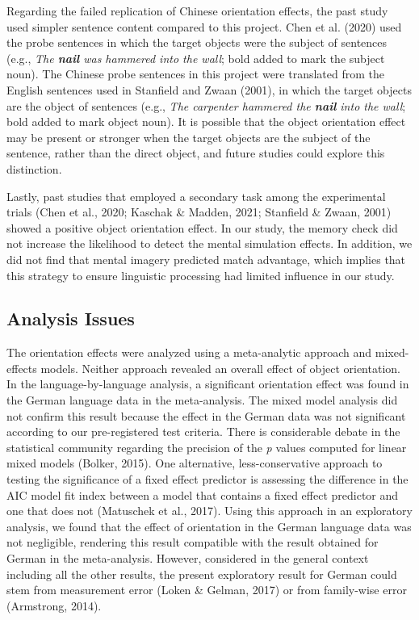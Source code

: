 \documentclass[
  man,floatsintext]{apa7}
\begin{document}
Regarding the failed replication of Chinese orientation effects, the
past study used simpler sentence content compared to this project.
Chen et al. (2020) used the probe sentences in which the target
objects were the subject of sentences (e.g., \emph{The \textbf{nail} was hammered
into the wall}; bold added to mark the subject noun). The Chinese probe
sentences in this project were translated from the English sentences
used in Stanfield and Zwaan (2001), in which the target objects are the
object of sentences (e.g., \emph{The carpenter hammered the \textbf{nail} into the
wall}; bold added to mark object noun). It is possible that the object
orientation effect may be present or stronger when the target objects
are the subject of the sentence, rather than the direct object, and
future studies could explore this distinction.

Lastly, past studies that employed a secondary task among the
experimental trials (Chen et al., 2020; Kaschak \& Madden, 2021; Stanfield \& Zwaan, 2001) showed a
positive object orientation effect. In our study, the memory check did
not increase the likelihood to detect the mental simulation effects. In
addition, we did not find that mental imagery predicted match advantage,
which implies that this strategy to ensure linguistic processing had
limited influence in our study.

\hypertarget{analysis-issues}{%
\subsection{Analysis Issues}\label{analysis-issues}}

The orientation effects were analyzed using a meta-analytic approach and
mixed-effects models. Neither approach revealed an overall effect of
object orientation. In the language-by-language analysis, a significant
orientation effect was found in the German language data in the
meta-analysis. The mixed model analysis did not confirm this result
because the effect in the German data was not significant according to
our pre-registered test criteria. There is considerable debate in the
statistical community regarding the precision of the \emph{p} values computed
for linear mixed models (Bolker, 2015). One alternative,
less-conservative approach to testing the significance of a fixed effect
predictor is assessing the difference in the AIC model fit index between
a model that contains a fixed effect predictor and one that does not
(Matuschek et al., 2017). Using this approach in an exploratory analysis, we
found that the effect of orientation in the German language data was not
negligible, rendering this result compatible with the result obtained
for German in the meta-analysis. However, considered in the general
context including all the other results, the present exploratory result
for German could stem from measurement error
(Loken \& Gelman, 2017) or from family-wise error
(Armstrong, 2014).
\end{document}
